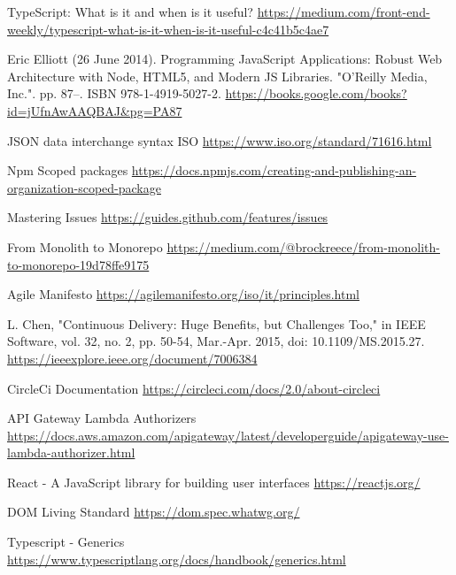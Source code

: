 \begin{thebibliography}{9}
     TypeScript: What is it and when is it useful?
    \url{https://medium.com/front-end-weekly/typescript-what-is-it-when-is-it-useful-c4c41b5c4ae7}

     Eric Elliott (26 June 2014). Programming JavaScript Applications: Robust Web Architecture with Node, HTML5, and Modern JS Libraries. "O'Reilly Media, Inc.". pp. 87–. ISBN 978-1-4919-5027-2.
    \url{https://books.google.com/books?id=jUfnAwAAQBAJ&pg=PA87}

     JSON data interchange syntax ISO
    \url{https://www.iso.org/standard/71616.html}

     Npm Scoped packages
    \url{https://docs.npmjs.com/creating-and-publishing-an-organization-scoped-package}

     Mastering Issues
    \url{https://guides.github.com/features/issues}

     From Monolith to Monorepo
    \url{https://medium.com/@brockreece/from-monolith-to-monorepo-19d78ffe9175}

     Agile Manifesto
    \url{https://agilemanifesto.org/iso/it/principles.html}

     L. Chen, "Continuous Delivery: Huge Benefits, but Challenges Too," in IEEE Software, vol. 32, no. 2, pp. 50-54, Mar.-Apr. 2015, doi: 10.1109/MS.2015.27.
    \url{https://ieeexplore.ieee.org/document/7006384}


     CircleCi Documentation
    \url{https://circleci.com/docs/2.0/about-circleci}

     API Gateway Lambda Authorizers
    \url{https://docs.aws.amazon.com/apigateway/latest/developerguide/apigateway-use-lambda-authorizer.html}

     React - A JavaScript library for building user interfaces
    \url{https://reactjs.org/}

     DOM Living Standard
    \url{https://dom.spec.whatwg.org/}

     Typescript - Generics
    \url{https://www.typescriptlang.org/docs/handbook/generics.html}


\end{thebibliography}
